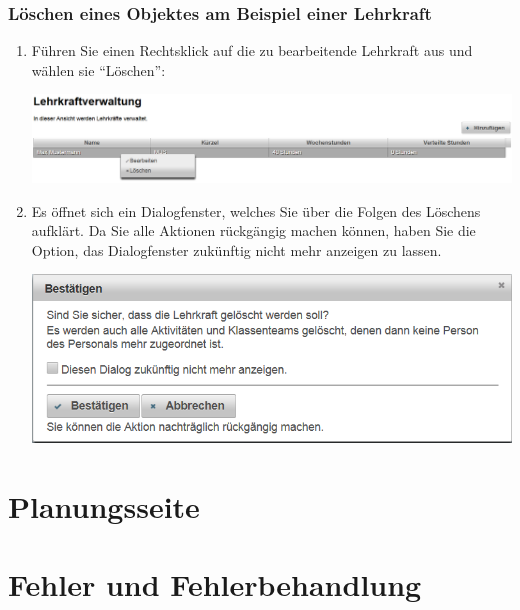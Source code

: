 \documentclass[fontsize=12pt]{scrartcl}
\begin{document}
\subsubsection{Löschen eines Objektes am Beispiel einer Lehrkraft}
\begin{enumerate}
\item Führen Sie einen Rechtsklick auf die zu bearbeitende Lehrkraft aus und wählen sie "`Löschen"': \medskip\\
	\begin{minipage}[t]{\linewidth}
            \includegraphics[width=1\linewidth]{images/editTeacher.png}
    \end{minipage}
\item Es öffnet sich ein Dialogfenster, welches Sie über die Folgen des Löschens aufklärt. Da Sie alle Aktionen rückgängig machen können, haben Sie die Option, das Dialogfenster zukünftig nicht mehr anzeigen zu lassen. \medskip\\
	\begin{minipage}[t]{\linewidth}
            \includegraphics[width=.8\linewidth]{images/confirmDialog.png}
    \end{minipage} 
\end{enumerate}

\section{Planungsseite}

\section{Fehler und Fehlerbehandlung}
\end{document}
